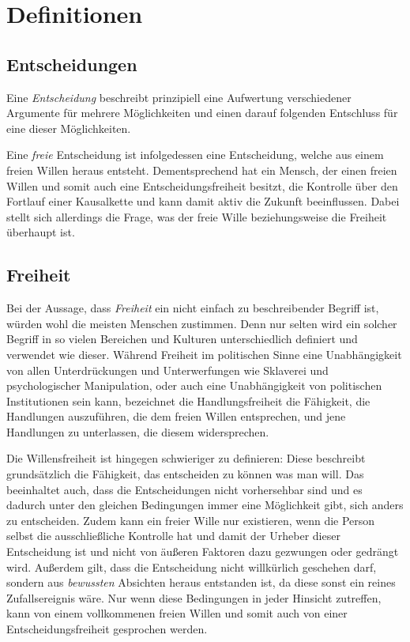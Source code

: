 \documentclass[a4paper, 12pt]{article}
\begin{document}
\section{Definitionen}
\subsection{Entscheidungen}
Eine \textit{Entscheidung} beschreibt prinzipiell eine Aufwertung verschiedener Argumente für mehrere Möglichkeiten und einen darauf folgenden Entschluss für eine dieser Möglichkeiten.

Eine \textit{freie} Entscheidung ist infolgedessen eine Entscheidung, welche aus einem freien Willen heraus entsteht. Dementsprechend hat ein Mensch, der einen freien Willen und somit auch eine Entscheidungsfreiheit besitzt, die Kontrolle über den Fortlauf einer Kausalkette und kann damit aktiv die Zukunft beeinflussen. Dabei stellt sich allerdings die Frage, was der freie Wille beziehungsweise die Freiheit überhaupt ist.

\subsection{Freiheit}
Bei der Aussage, dass \textit{Freiheit} ein nicht einfach zu beschreibender Begriff ist, würden wohl die meisten Menschen zustimmen. Denn nur selten wird ein solcher Begriff in so vielen Bereichen und Kulturen unterschiedlich definiert und verwendet wie dieser. Während Freiheit im politischen Sinne eine Unabhängigkeit von allen Unterdrückungen und Unterwerfungen wie Sklaverei und psychologischer Manipulation, oder auch eine Unabhängigkeit von politischen Institutionen sein kann, bezeichnet die Handlungsfreiheit die Fähigkeit, die Handlungen auszuführen, die dem freien Willen entsprechen, und jene Handlungen zu unterlassen, die diesem widersprechen.

Die Willensfreiheit ist hingegen schwieriger zu definieren: Diese beschreibt grundsätzlich die Fähigkeit, das entscheiden zu können was man will. Das beeinhaltet auch, dass die Entscheidungen nicht vorhersehbar sind und es dadurch unter den gleichen Bedingungen immer eine Möglichkeit gibt, sich anders zu entscheiden. Zudem kann ein freier Wille nur existieren, wenn die Person selbst die ausschließliche Kontrolle hat und damit der Urheber dieser Entscheidung ist und nicht von äußeren Faktoren dazu gezwungen oder gedrängt wird. Außerdem gilt, dass die Entscheidung nicht willkürlich geschehen darf, sondern aus \textit{bewussten} Absichten heraus entstanden ist, da diese sonst ein reines Zufallsereignis wäre. Nur wenn diese Bedingungen in jeder Hinsicht zutreffen, kann von einem vollkommenen freien Willen und somit auch von einer Entscheidungsfreiheit gesprochen werden.
\end{document}
